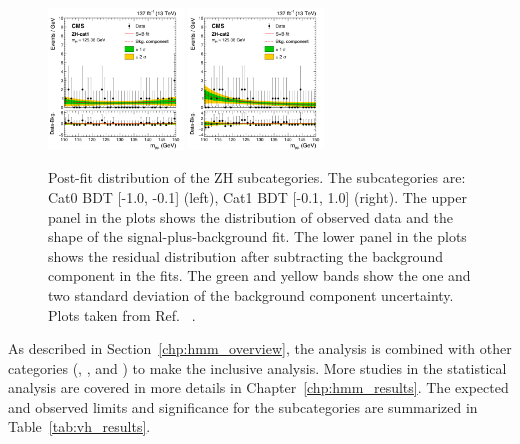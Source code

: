 \begin{figure}[!htb]
  \centering
  \captionsetup{justification=justified}
  \includegraphics[width=0.32\textwidth]{pics/VH_sec/VH_results/postfit_ZH_cat1.png}
  \includegraphics[width=0.32\textwidth]{pics/VH_sec/VH_results/postfit_ZH_cat2.png}
  \caption{Post-fit \mmm distribution of the ZH subcategories. The subcategories are: Cat0 BDT [-1.0, -0.1] (left), Cat1 BDT [-0.1, 1.0] (right). 
           The upper panel in the plots shows the distribution of observed data and the shape of the signal-plus-background fit.
           The lower panel in the plots shows the residual distribution after subtracting the background component in the fits.
           The green and yellow bands show the one and two standard deviation of the background component uncertainty.
           Plots taken from Ref. ~\cite{Sirunyan_2021}.}
  \label{fig:zh_postfit}
\end{figure}

As described in Section~\ref{chp:hmm_overview}, 
the \VH analysis is combined with other categories (\ggH, \qqH, and \ttH) to make the inclusive \hmm analysis.
More studies in the statistical analysis are covered in more details in Chapter~\ref{chp:hmm_results}.
The expected and observed limits and significance for the \VH subcategories are summarized in Table~\ref{tab:vh_results}.

